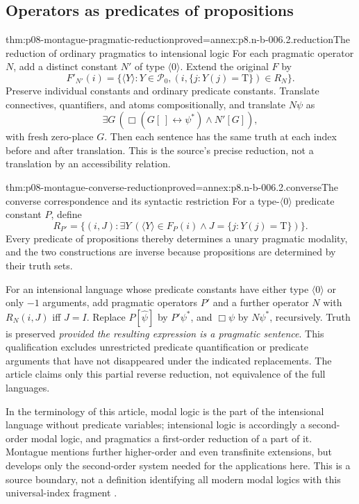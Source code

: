 \subsection{Operators as predicates of propositions}

\begin{hbtheorem}{thm:p08-montague-pragmatic-reduction}{proved=annex:p8.n-b-006.2.reduction}{The reduction of ordinary pragmatics to intensional logic}
For each pragmatic operator \(N\), add a distinct constant \(N'\)
of type \(\langle0\rangle\). Extend the original \(F\) by
\[
 F'_{N'}(i)=\{\langle Y\rangle:Y\in\mathcal P_0,
                (i,\{j:Y(j)=\mathrm T\})\in R_N\}.
\]
Preserve individual constants and ordinary predicate constants. Translate
connectives, quantifiers, and atoms compositionally, and translate
\(N\psi\) as
\[
 \exists G\,(\Box(G[\ ]\leftrightarrow\psi^*)\land N'[G]),
\]
with fresh zero-place \(G\). Then each sentence has the same truth at
each index before and after translation. This is the source's precise
reduction, not a translation by an accessibility relation.
\end{hbtheorem}

\begin{hbtheorem}{thm:p08-montague-converse-reduction}{proved=annex:p8.n-b-006.2.converse}{The converse correspondence and its syntactic restriction}
For a type-\(\langle0\rangle\) predicate constant \(P\), define
\[
 R_{P'}=\{(i,J):\exists Y\ (\langle Y\rangle\in F_P(i)
                         \land J=\{j:Y(j)=\mathrm T\})\}.
\]
Every predicate of propositions thereby determines a unary pragmatic
modality, and the two constructions are inverse because propositions
are determined by their truth sets.

For an intensional language whose predicate constants have either type
\(\langle0\rangle\) or only \(-1\) arguments, add pragmatic
operators \(P'\) and a further operator \(N\) with
\(R_N(i,J)\) iff \(J=I\). Replace \(P[\widehat\psi]\) by
\(P'\psi^*\), and \(\Box\psi\) by \(N\psi^*\), recursively.
Truth is preserved \emph{provided the resulting expression is a
pragmatic sentence}. This qualification excludes unrestricted predicate
quantification or predicate arguments that have not disappeared under
the indicated replacements. The article claims only this partial reverse
reduction, not equivalence of the full languages.
\end{hbtheorem}

In the terminology of this article, modal logic is the part of the
intensional language without predicate variables; intensional logic is
accordingly a second-order modal logic, and pragmatics a first-order
reduction of a part of it. Montague mentions further higher-order and
even transfinite extensions, but develops only the second-order system
needed for the applications here. This is a source boundary, not a
definition identifying all modern modal logics with this universal-index
fragment \cite[p.~84]{Montague1970Pragmatics}.

